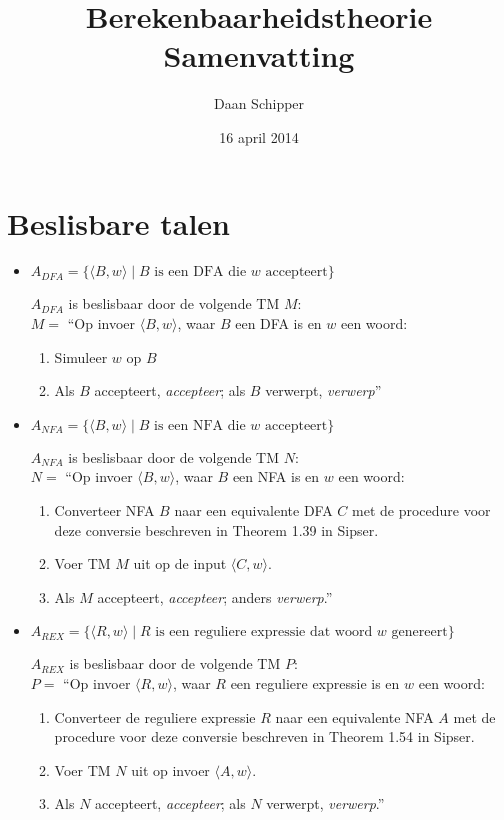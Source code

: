 \documentclass[]{article}
\begin{document}
\title{Berekenbaarheidstheorie Samenvatting}
\author{Daan Schipper}
\date{16 april 2014}
\maketitle

\section*{Beslisbare talen}
\begin{itemize}
	\item $A_{DFA} = \{ \langle B, w \rangle \mid B \mbox{ is een DFA die $w$ accepteert} \} $
	
	$A_{DFA}$ is beslisbaar door de volgende TM $M$: \\
	$M = $ ``Op invoer $\langle B, w \rangle$, waar $B$ een DFA is en $w$ een woord:
	\begin{enumerate}
		\item Simuleer $w$ op $B$
		\item Als $B$ accepteert, \emph{accepteer}; als $B$ verwerpt, \emph{verwerp}''
	\end{enumerate}
	
	
	\item $A_{NFA} = \{ \langle B, w \rangle \mid B \mbox{ is een NFA die $w$ accepteert} \} $
	
	$A_{NFA}$ is beslisbaar door de volgende TM $N$: \\
	$N = $ ``Op invoer $\langle B, w \rangle$, waar $B$ een NFA is en $w$ een woord:
	\begin{enumerate}
		\item Converteer NFA $B$ naar een equivalente DFA $C$ met de procedure voor deze conversie beschreven in Theorem 1.39 in Sipser.
		\item Voer TM $M$ uit op de input $\langle C, w \rangle$.
		\item Als $M$ accepteert, \emph{accepteer}; anders \emph{verwerp}.''
	\end{enumerate}
	
	
	\item $A_{REX} = \{ \langle R, w \rangle \mid R \mbox{ is een reguliere expressie dat woord $w$ genereert} \} $
	
	$A_{REX}$ is beslisbaar door de volgende TM $P$: \\
	$P = $ ``Op invoer $\langle R, w \rangle$, waar $R$ een reguliere expressie is en $w$ een woord:
	\begin{enumerate}
		\item Converteer de reguliere expressie $R$ naar een equivalente NFA $A$ met de procedure voor deze conversie beschreven in Theorem 1.54 in Sipser.
		\item Voer TM $N$ uit op invoer $\langle A, w \rangle$.
		\item Als $N$ accepteert, \emph{accepteer}; als $N$ verwerpt, \emph{verwerp}.''
	\end{enumerate}
	

\end{itemize}
\end{document}
